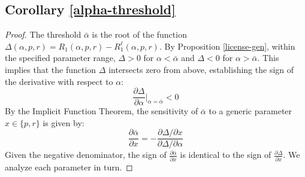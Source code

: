 \subsection*{Corollary \ref{alpha-threshold}}
\begin{proof}
    The threshold $\bar{\alpha}$ is the root of the function $\Delta(\alpha, p, r) = R_1(\alpha, p, r) - R_1^\ell(\alpha, p, r)$.
    By Proposition \ref{license-gen}, within the specified parameter range, $\Delta > 0$ for $\alpha < \bar{\alpha}$ and $\Delta < 0$ for $\alpha > \bar{\alpha}$. This implies that the function $\Delta$ intersects zero from above, establishing the sign of the derivative with respect to $\alpha$:
    \begin{equation*}
        \frac{\partial \Delta}{\partial \alpha} \bigg|_{\alpha = \bar{\alpha}} < 0
    \end{equation*}
    By the Implicit Function Theorem, the sensitivity of $\bar{\alpha}$ to a generic parameter $x \in \{p, r\}$ is given by:
    \begin{equation*}
        \frac{\partial \bar{\alpha}}{\partial x} = - \frac{\partial \Delta / \partial x}{\partial \Delta / \partial \alpha}
    \end{equation*}
    Given the negative denominator, the sign of $\frac{\partial \bar{\alpha}}{\partial x}$ is identical to the sign of $\frac{\partial \Delta}{\partial x}$. We analyze each parameter in turn.


\end{proof}
